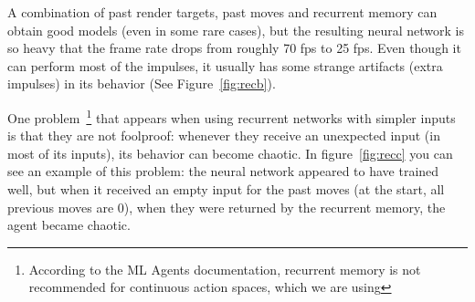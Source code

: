 A combination of past render targets, past moves and recurrent memory can obtain good models (even in some rare cases), but the resulting neural network is so heavy that the frame rate drops from roughly 70 fps to 25 fps. Even though it can perform most of the impulses, it usually has some strange artifacts (extra impulses) in its behavior (See Figure~\ref{fig:recb}).

One problem~\footnote{According to the ML Agents documentation, recurrent memory is not recommended for continuous action spaces, which we are using} that appears when using recurrent networks with simpler inputs is that they are not foolproof: whenever they receive an unexpected input (in most of its inputs), its behavior can become chaotic. In figure~\ref{fig:recc} you can see an example of this problem: the neural network appeared to have trained well, but when it received an empty input for the past moves (at the start, all previous moves are 0), when they were returned by the recurrent memory, the agent became chaotic.

